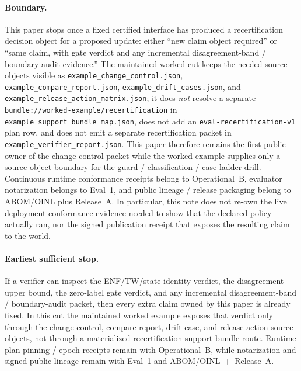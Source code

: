\documentclass[11pt]{article}
\begin{document}
\paragraph{Boundary.}
This paper stops once a fixed certified interface has produced a recertification decision object for a proposed update: either ``new claim object required'' or ``same claim, with gate verdict and any incremental disagreement-band / boundary-audit evidence.'' The maintained worked cut keeps the needed source objects visible as 
\nolinkurl{example\_change\_control.json}, 
\nolinkurl{example\_compare\_report.json}, 
\nolinkurl{example\_drift\_cases.json}, and 
\nolinkurl{example\_release\_action\_matrix.json}; it does \emph{not} resolve a separate 
\nolinkurl{bundle://worked-example/recertification} in 
\nolinkurl{example\_support\_bundle\_map.json}, does not add an 
\nolinkurl{eval-recertification-v1} plan row, and does not emit a separate recertification packet in 
\nolinkurl{example\_verifier\_report.json}. This paper therefore remains the first public owner of the change-control packet while the worked example supplies only a source-object boundary for the guard / classification / case-ladder drill. Continuous runtime conformance receipts belong to Operational~B, evaluator notarization belongs to Eval~1, and public lineage / release packaging belong to ABOM/OINL plus Release~A.\cite{series:workedexample,series:operationalB,series:eval1,series:releaseA} In particular, this note does not re-own the live deployment-conformance evidence needed to show that the declared policy actually ran, nor the signed publication receipt that exposes the resulting claim to the world.

\paragraph{Earliest sufficient stop.}
If a verifier can inspect the ENF/TW/state identity verdict, the disagreement upper bound, the zero-label gate verdict, and any incremental disagreement-band / boundary-audit packet, then every extra claim owned by this paper is already fixed. In this cut the maintained worked example exposes that verdict only through the change-control, compare-report, drift-case, and release-action source objects, not through a materialized recertification support-bundle route. Runtime plan-pinning / epoch receipts remain with Operational~B, while notarization and signed public lineage remain with Eval~1 and ABOM/OINL~+~Release~A.\cite{series:workedexample,series:operationalB,series:eval1,series:releaseA}
\end{document}

